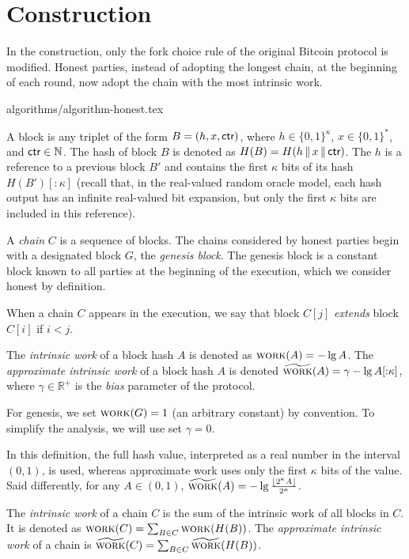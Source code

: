 \section{Construction}\label{sec:construction}
In the \poem construction, only the fork choice rule
of the original Bitcoin protocol is modified.
Honest parties, instead of adopting the longest chain, at the beginning
of each round, now adopt the chain with the most intrinsic work.

{algorithms/algorithm-honest.tex}

A block is any triplet of the
form $B = (h, x, \textsf{ctr})$, where $h \in \{0,1\}^\kappa$, $x \in \{0, 1\}^*$, and $\textsf{ctr} \in \mathbb{N}$.
The hash of block $B$ is denoted as $H(B) = H(h \,\|\, x \,\|\, \textsf{ctr})$.
The $h$ is a reference to a previous block $B'$ and
contains the first $\kappa$ bits of its hash $H(B')[{:}{\kappa}]$
(recall that, in the real-valued random oracle model, each hash
output has an infinite real-valued bit expansion, but only the first
$\kappa$ bits are included in this reference).

A \emph{chain} $C$ is a sequence of blocks. The chains considered by honest
parties begin with a designated
block $G$, the \emph{genesis block}. The genesis block is a constant block
known to all parties at the beginning of the execution,
which we consider honest by definition.

When a chain $C$ appears in the execution,
we say that block $C[j]$ \emph{extends} block $C[i]$ if $i < j$.

\begin{definition}
  The \emph{intrinsic work} of a block hash
  $A$ is denoted as $\textsc{work}(A) = -\lg A$.
  The \emph{approximate intrinsic work} of a block hash $A$ is denoted
  $\widetilde{\textsc{work}}(A) = \gamma - \lg A[{:}{\kappa}]$, where $\gamma \in \mathbb{R}^+$
  is the \emph{bias} parameter of the protocol.
\end{definition}

For genesis, we set $\textsc{work}(G) = 1$ (an arbitrary constant) by convention.
To simplify the analysis, we will use set $\gamma = 0$.

In this definition, the full hash value, interpreted as a real number in the interval
$(0, 1)$, is used, whereas approximate work uses only the first $\kappa$ bits of the
value. Said differently, for any $A \in (0, 1)$,
$\widetilde{\textsc{work}}(A) = -\lg \frac{\lfloor 2^\kappa A \rfloor}{2^\kappa}$.

\begin{definition}
  The \emph{intrinsic work} of a chain
  $C$ is the sum of the
  intrinsic work of all blocks in $C$.
  It is denoted as $\textsc{work}(C) = \sum_{B \in C}{\textsc{work}(H(B))}$.
  The \emph{approximate intrinsic work} of a chain
  is $\widetilde{\textsc{work}}(C) = \sum_{B \in C}{\widetilde{\textsc{work}}(H(B))}$.
\end{definition}

